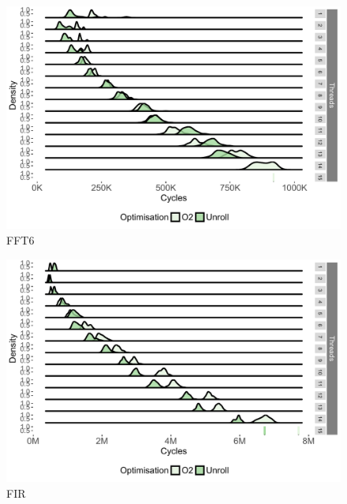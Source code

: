 \begin{appendices}
\begin{figure}[!htb]
\center
\includegraphics[width=1\textwidth]{streamit-paper/graphics/appendixgraphs/fft6-total.pdf}
\caption{FFT6}\label{chp:stream:f6t}
\end{figure}

\begin{figure}[!htb]
\center
\includegraphics[width=1\textwidth]{streamit-paper/graphics/appendixgraphs/fir-total.pdf}
\caption{FIR}\label{chp:stream:fit}
\end{figure}


\end{appendices}
